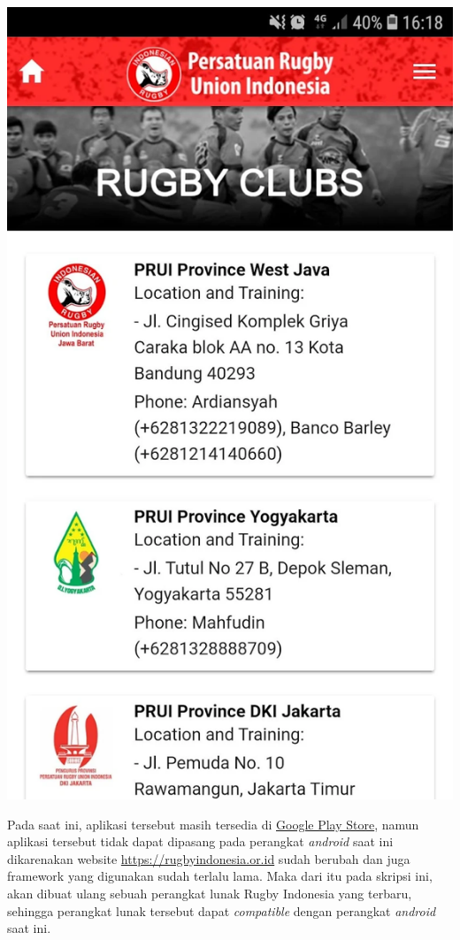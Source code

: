 \documentclass[a4paper,twoside]{article}
\begin{document}
\includegraphics[scale=0.125]{rugby_clubs.png}

Pada saat ini, aplikasi tersebut masih tersedia di \href{https://play.google.com/}{Google Play Store}, namun aplikasi tersebut tidak dapat dipasang pada perangkat \textit{android} saat ini dikarenakan website \url{https://rugbyindonesia.or.id} sudah berubah dan juga framework yang digunakan sudah terlalu lama. Maka dari itu pada skripsi ini, akan dibuat ulang sebuah perangkat lunak Rugby Indonesia yang terbaru, sehingga perangkat lunak tersebut dapat \textit{compatible} dengan perangkat \textit{android} saat ini.
\end{document}
